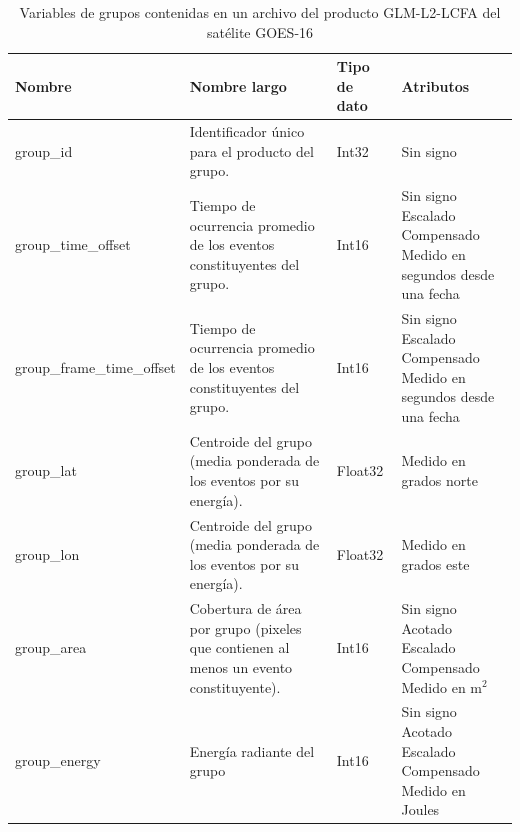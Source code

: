 \begin{table}[H]
  \centering
  \small
  \caption{
    Variables de grupos contenidas en un archivo del producto GLM-L2-LCFA del
    satélite GOES-16
  }
  \label{tab:vars_groups_glm}
  \begin{tabular}{l|p{3cm}|p{1.15cm}|p{3.5cm}}
    \textbf{Nombre} & 
    \textbf{Nombre largo} & 
    \textbf{Tipo de dato} & 
    \textbf{Atributos} \\ \hline

    group\_id &
    Identificador único para el producto del grupo.&
    Int32 &
    \parbox[t]{3.5cm}{Sin signo}\\ \hline

    group\_time\_offset &
    Tiempo de ocurrencia promedio de los eventos constituyentes del grupo.&
    Int16 &
    \parbox[t]{3.5cm}{Sin signo \\ Escalado \\ Compensado \\ Medido en segundos desde una fecha}\\ \hline

    group\_frame\_time\_offset &
    Tiempo de ocurrencia promedio de los eventos constituyentes del grupo.&
    Int16 &
    \parbox[t]{3.5cm}{Sin signo \\ Escalado \\ Compensado \\ Medido en segundos desde una fecha}\\ \hline

    group\_lat &
    Centroide del grupo (media ponderada de los eventos por su energía).&
    Float32 &
    \parbox[t]{3.5cm}{Medido en grados norte}\\ \hline

    group\_lon &
    Centroide del grupo (media ponderada de los eventos por su energía).&
    Float32 &
    \parbox[t]{3.5cm}{Medido en grados este}\\ \hline

    group\_area &
    Cobertura de área por grupo (pixeles que contienen al menos un evento constituyente).&
    Int16 &
    \parbox[t]{3.5cm}{Sin signo \\ Acotado \\ Escalado \\ Compensado \\ Medido en m$^2$}\\ \hline

    group\_energy &
    Energía radiante del grupo&
    Int16 &
    \parbox[t]{3.5cm}{Sin signo \\ Acotado \\ Escalado \\ Compensado \\ Medido en Joules}\\ \hline


\end{tabular}
\end{table}
